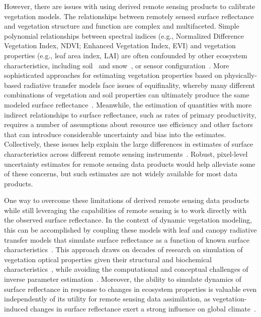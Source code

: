 However, there are issues with using derived remote sensing products to calibrate vegetation models.
The relationships between remotely sensed surface reflectance and vegetation structure and function are complex and multifaceted.
Simple polynomial relationships between spectral indices (e.g., Normalized Difference Vegetation Index, NDVI; Enhanced Vegetation Index, EVI) and vegetation properties (e.g., leaf area index, LAI) are often confounded by other ecosystem characteristics, including soil~\citep{myneni1994relationship} and snow~\citep{zhang2020evaluating}, or sensor configuration~\citep{fensholt2004evaluation}.
More sophisticated approaches for estimating vegetation properties based on physically-based radiative transfer models face issues of equifinality, whereby many different combinations of vegetation and soil properties can ultimately produce the same modeled surface reflectance~\citep{combal2003retrieval, lewis2007spectral}.
Meanwhile, the estimation of quantities with more indirect relationships to surface reflectance, such as rates of primary productivity, requires a number of assumptions about resource use efficiency and other factors~\citep{running2004continuous} that can introduce considerable uncertainty and bias into the estimates.
Collectively, these issues help explain the large differences in estimates of surface characteristics across different remote sensing instruments~\citep{liu_2018_satellite}.
Robust, pixel-level uncertainty estimates for remote sensing data products would help alleviate some of these concerns, but such estimates are not widely available for most data products.

One way to overcome these limitations of derived remote sensing data products while still leveraging the capabilities of remote sensing is to work directly with the observed surface reflectance.
In the context of dynamic vegetation modeling, this can be accomplished by coupling these models with leaf and canopy radiative transfer models that simulate surface reflectance as a function of known surface characteristics~\citep{knorr2001assimilation, nouvellon2001coupling, quaife2008assimilating}.
This approach draws on decades of research on simulation of vegetation optical properties given their structural and biochemical characteristics~\citep{dickinson_1983_land, sellers1985canopy, verhoef1984light, lewis2007spectral, jacquemoud2009prospect, pinty2004synergy, widlowski2007third, widlowski2015fourth, hogan_2018_fast}, while avoiding the computational and conceptual challenges of inverse parameter estimation~\citep{combal2003retrieval, lewis2007spectral}.
Moreover, the ability to simulate dynamics of surface reflectance in response to changes in ecosystem properties is valuable even independently of its utility for remote sensing data assimilation, as vegetation-induced changes in surface reflectance exert a strong influence on global climate~\citep{bonan2008forests, swann2010changes, swann2012midlatitude}.

